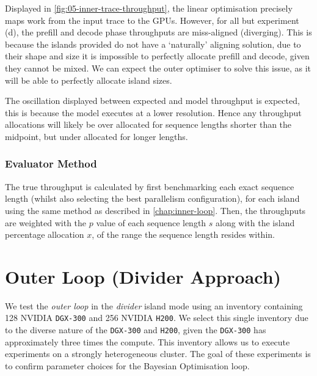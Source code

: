 Displayed in \autoref{fig:05-inner-trace-throughput}, the linear optimisation precisely maps work from the input trace to the GPUs.
However, for all but experiment (d), the prefill and decode phase throughputs are miss-aligned (diverging).
This is because the islands provided do not have a `naturally' aligning solution, due to their shape and size it is impossible to perfectly allocate prefill and decode, given they cannot be mixed.
 We can expect the outer optimiser to solve this issue, as it will be able to perfectly allocate island sizes. 

The oscillation displayed between expected and model throughput is expected, this is because the model executes at a lower resolution.
Hence any throughput allocations will likely be over allocated for sequence lengths shorter than the midpoint, but under allocated for longer lengths.

\subsubsection{Evaluator Method}
The true throughput is calculated by first benchmarking each exact sequence length (whilst also selecting the best parallelism configuration), for each island using the same method as described in \autoref{chap:inner-loop}.
Then, the throughputs are weighted with the $p$ value of each sequence length $s$ along with the island percentage allocation $x$, of the range the sequence length resides within.

%

\origclearpage
\section{Outer Loop (Divider Approach)}
\label{chap:eval-outer-divider}

We test the \textit{outer loop} in the \textit{divider} island mode using an inventory containing 128 NVIDIA \texttt{DGX-300} and 256 NVIDIA \texttt{H200}.
We select this single inventory due to the diverse nature of the \texttt{DGX-300} and \texttt{H200}, given the \texttt{DGX-300} has approximately three times the compute.
This inventory allows us to execute experiments on a strongly heterogeneous cluster.
The goal of these experiments is to confirm parameter choices for the Bayesian Optimisation loop.


